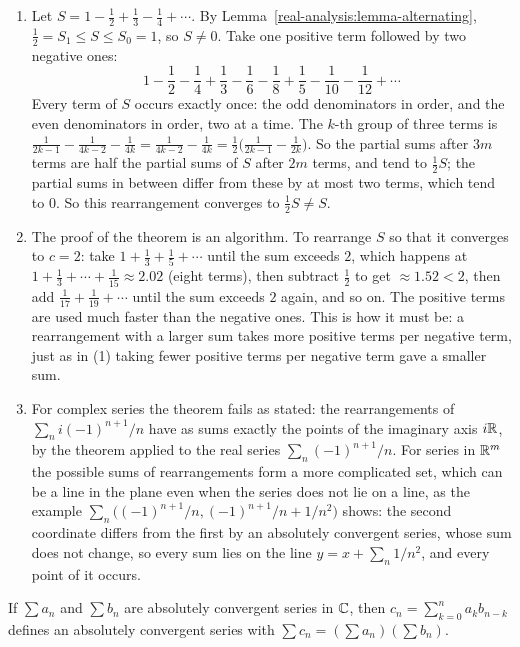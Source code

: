 \begin{example}\label{real-analysis:example-rearrangement}
\begin{enumerate}
\item Let $S = 1 - \frac12 + \frac13 - \frac14 + \cdots$. By Lemma~\ref{real-analysis:lemma-alternating}, $\frac12 = S_1 \leq S \leq S_0 = 1$, so $S \neq 0$. Take one positive term followed by two
negative ones:
\[
1 - \frac12 - \frac14 + \frac13 - \frac16 - \frac18 + \frac15 - \frac1{10} - \frac1{12} + \cdots
\]
Every term of $S$ occurs exactly once: the odd denominators in order, and the even denominators in order, two at a time. The $k$-th group of three terms is
$\frac{1}{2k - 1} - \frac{1}{4k - 2} - \frac{1}{4k} = \frac{1}{4k - 2} - \frac{1}{4k} = \frac12\bigl(\frac{1}{2k - 1} - \frac{1}{2k}\bigr)$. So the partial sums after $3m$ terms are half the partial
sums of $S$ after $2m$ terms, and tend to $\frac12S$; the partial sums in between differ from these by at most two terms, which tend to $0$. So this rearrangement converges to $\frac12S \neq S$.
\item The proof of the theorem is an algorithm. To rearrange $S$ so that it converges to $c = 2$: take $1 + \frac13 + \frac15 + \cdots$ until the sum exceeds $2$, which happens at
$1 + \frac13 + \cdots + \frac1{15} \approx 2.02$ (eight terms), then subtract $\frac12$ to get $\approx 1.52 < 2$, then add $\frac1{17} + \frac1{19} + \cdots$ until the sum exceeds $2$ again, and so on.
The positive terms are used much faster than the negative ones. This is how it must be: a rearrangement with a larger sum takes more positive terms per negative term, just as in (1)
taking fewer positive terms per negative term gave a smaller sum.
\item For complex series the theorem fails as stated: the rearrangements of $\sum_ni(-1)^{n+1}/n$ have as sums exactly the points of the imaginary axis $i\mathbb{R}$, by the theorem applied to the real series
$\sum_n(-1)^{n+1}/n$. For series in $\mathbb{R}^m$ the possible sums of rearrangements form a more complicated set, which can be a line in the plane even when the series does not lie on a line, as the example
$\sum_n\bigl((-1)^{n+1}/n, (-1)^{n+1}/n + 1/n^2\bigr)$ shows: the second coordinate differs from the first by an absolutely convergent series, whose sum does not change, so every sum lies on the line
$y = x + \sum_n1/n^2$, and every point of it occurs.
\end{enumerate}
\end{example}

\begin{proposition}\label{real-analysis:proposition-cauchy-product}
If $\sum a_n$ and $\sum b_n$ are absolutely convergent series in $\mathbb{C}$, then $c_n = \sum_{k=0}^na_kb_{n-k}$ defines an absolutely convergent series with
$\sum c_n = (\sum a_n)(\sum b_n)$.
\end{proposition}

